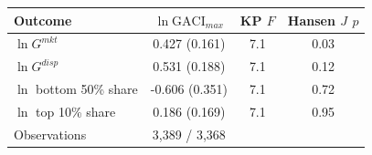 \begin{tabular}{lccc}
\toprule
Outcome & $\ln\mathrm{GACI}_{max}$ & KP $F$ & Hansen $J$ $p$ \\
\midrule
$\ln G^{mkt}$ & 0.427\sym{***} (0.161) & 7.1 & 0.03 \\
$\ln G^{disp}$ & 0.531\sym{***} (0.188) & 7.1 & 0.12 \\
$\ln$ bottom 50\% share & -0.606\sym{*} (0.351) & 7.1 & 0.72 \\
$\ln$ top 10\% share & 0.186 (0.169) & 7.1 & 0.95 \\
\midrule
Observations & 3,389 / 3,368 & & \\
\bottomrule
\end{tabular}
